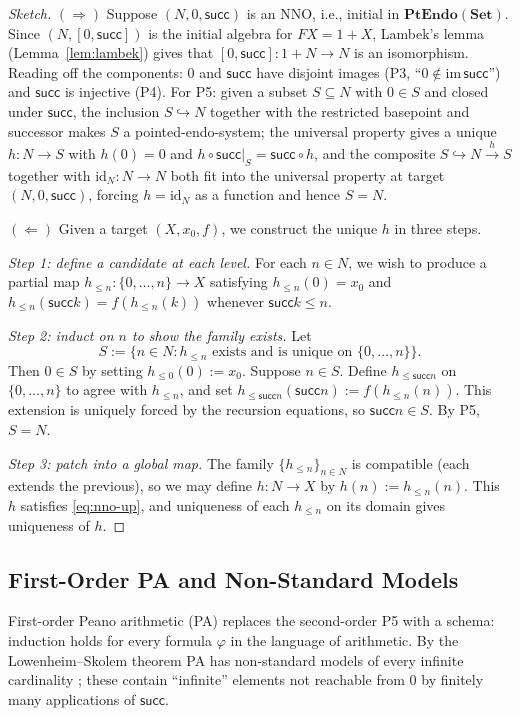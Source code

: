 \documentclass[12pt]{article}
\theoremstyle{definition}
\theoremstyle{remark}
\newcommand{\Set}{\mathbf{Set}}
\newcommand{\id}{\mathrm{id}}
\newcommand{\suc}{\mathsf{succ}}
\newcommand{\PtEndo}{\mathbf{PtEndo}}
\begin{document}
\begin{proof}[Sketch]
$(\Rightarrow)$ Suppose $(N, 0, \suc)$ is an NNO, i.e., initial in $\PtEndo(\Set)$. Since $(N, [0, \suc])$ is the initial algebra for $F X = 1 + X$, Lambek's lemma (Lemma~\ref{lem:lambek}) gives that $[0, \suc] \colon 1 + N \to N$ is an isomorphism. Reading off the components: $0$ and $\suc$ have disjoint images (P3, ``$0 \notin \mathrm{im}\,\suc$'') and $\suc$ is injective (P4). For P5: given a subset $S \subseteq N$ with $0 \in S$ and closed under $\suc$, the inclusion $S \hookrightarrow N$ together with the restricted basepoint and successor makes $S$ a pointed-endo-system; the universal property gives a unique $h \colon N \to S$ with $h(0) = 0$ and $h \circ \suc|_S = \suc \circ h$, and the composite $S \hookrightarrow N \xrightarrow{h} S$ together with $\id_N \colon N \to N$ both fit into the universal property at target $(N, 0, \suc)$, forcing $h = \id_N$ as a function and hence $S = N$.

$(\Leftarrow)$ Given a target $(X, x_0, f)$, we construct the unique $h$ in three steps.

\emph{Step 1: define a candidate at each level.} For each $n \in N$, we wish to produce a partial map $h_{\le n} \colon \{0, \dots, n\} \to X$ satisfying $h_{\le n}(0) = x_0$ and $h_{\le n}(\suc k) = f(h_{\le n}(k))$ whenever $\suc k \le n$.

\emph{Step 2: induct on $n$ to show the family exists.} Let
\[
S := \{n \in N : h_{\le n} \text{ exists and is unique on } \{0, \dots, n\}\}.
\]
Then $0 \in S$ by setting $h_{\le 0}(0) := x_0$. Suppose $n \in S$. Define $h_{\le \suc n}$ on $\{0, \dots, n\}$ to agree with $h_{\le n}$, and set $h_{\le \suc n}(\suc n) := f(h_{\le n}(n))$. This extension is uniquely forced by the recursion equations, so $\suc n \in S$. By P5, $S = N$.

\emph{Step 3: patch into a global map.} The family $\{h_{\le n}\}_{n \in N}$ is compatible (each extends the previous), so we may define $h \colon N \to X$ by $h(n) := h_{\le n}(n)$. This $h$ satisfies \eqref{eq:nno-up}, and uniqueness of each $h_{\le n}$ on its domain gives uniqueness of $h$.
\end{proof}

\subsection{First-Order PA and Non-Standard Models}

First-order Peano arithmetic (PA) replaces the second-order P5 with a schema: induction holds for every formula $\varphi$ in the language of arithmetic. By the Lowenheim--Skolem theorem PA has non-standard models of every infinite cardinality \cite{Skolem1934}; these contain ``infinite'' elements not reachable from $0$ by finitely many applications of $\suc$.
\end{document}
